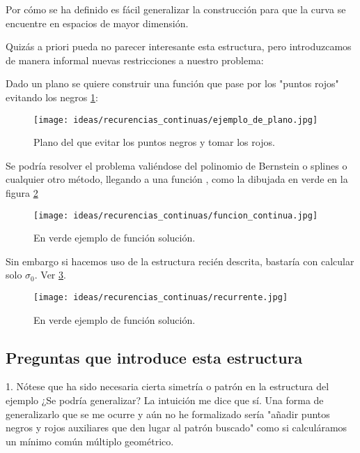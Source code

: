 Por cómo se ha definido es fácil generalizar la construcción para que la curva se encuentre en 
espacios de mayor dimensión. 

Quizás a priori pueda no parecer interesante esta estructura, pero introduzcamos 
de manera informal nuevas restricciones a nuestro problema: 

Dado un plano se quiere construir una función que pase por los "puntos rojos" evitando los negros 
\ref{img:idea_recurrencia_plano}: 

\begin{figure}[h!]
    \texttt{[image: ideas/recurencias\_continuas/ejemplo\_de\_plano.jpg]}
    \caption{Plano del que evitar los puntos negros y tomar los rojos.}
    \label{img:idea_recurrencia_plano}
\end{figure}

Se podría resolver el problema valiéndose del polinomio de Bernstein o splines o
cualquier otro método, llegando a una función , como la dibujada en verde en la
figura \ref{img:idea_recurrencia_funcion_verde}

\begin{figure}[h!]
    \texttt{[image: ideas/recurencias\_continuas/funcion\_continua.jpg]}
    \caption{En verde ejemplo de función solución.}
    \label{img:idea_recurrencia_funcion_verde}
\end{figure} 

Sin embargo si hacemos uso de la estructura recién descrita, bastaría con 
calcular solo $\sigma_0$.
 Ver \ref{img:idea_recurrencia_sigma_cero}.  

\begin{figure}[h!]
    \texttt{[image: ideas/recurencias\_continuas/recurrente.jpg]}
    \caption{En verde ejemplo de función solución.}
    \label{img:idea_recurrencia_sigma_cero}
\end{figure} 


\subsection{ Preguntas que introduce esta estructura}

1. Nótese que ha sido necesaria cierta simetría o patrón en la estructura del ejemplo
¿Se podría generalizar? 
La intuición me dice que sí.
Una forma de generalizarlo que se me ocurre y aún no he formalizado
 sería "añadir puntos negros y rojos auxiliares que den lugar al patrón buscado"
 como si calculáramos un mínimo común múltiplo geométrico.  




